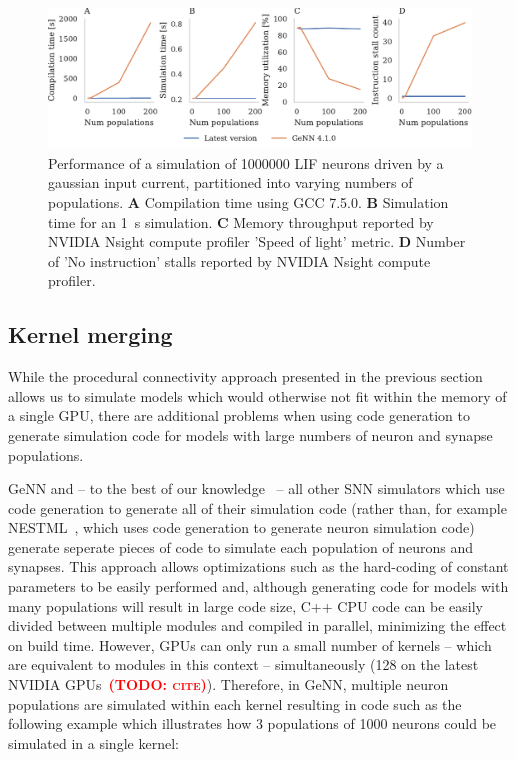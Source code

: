 \documentclass[9pt,twocolumn,twoside,lineno]{pnas-new}
\newcommand{\todo}[1]{\textbf{\textsc{\textcolor{red}{(TODO: #1)}}}}
\begin{document}
\begin{figure}
    \centering
    \includegraphics{figures/merging_scaling}
    \caption{Performance of a simulation of \num{1000000} LIF neurons driven by a gaussian input current, partitioned into varying numbers of populations. 
    \textbf{A} Compilation time using GCC 7.5.0.
    \textbf{B} Simulation time for an \SI{1}{\second} simulation.
    \textbf{C} Memory throughput reported by NVIDIA Nsight compute profiler 'Speed of light' metric.
    \textbf{D} Number of 'No instruction' stalls reported by NVIDIA Nsight compute profiler.}
    \label{fig:merging_scaling}
\end{figure}

\subsection*{Kernel merging}
While the procedural connectivity approach presented in the previous section allows us to simulate models which would otherwise not fit within the memory of a single GPU, there are additional problems when using code generation to generate simulation code for models with large numbers of neuron and synapse populations.

GeNN and -- to the best of our knowledge~\citep{Blundell2018} -- all other SNN simulators which use code generation to generate all of their simulation code (rather than, for example NESTML~\citep{Plotnikov2016}, which uses code generation to generate neuron simulation code) generate seperate pieces of code to simulate each population of neurons and synapses.
This approach allows optimizations such as the hard-coding of constant parameters to be easily performed and, although generating code for models with many populations will result in large code size, C++ CPU code  can be easily divided between multiple modules and compiled in parallel, minimizing the effect on build time.
However, GPUs can only run a small number of kernels -- which are equivalent to modules in this context --  simultaneously (128 on the latest NVIDIA GPUs~\todo{cite}).
Therefore, in GeNN, multiple neuron populations are simulated within each kernel resulting in code such as the following example which illustrates how 3 populations of 1000 neurons could be simulated in a single kernel:
\end{document}
